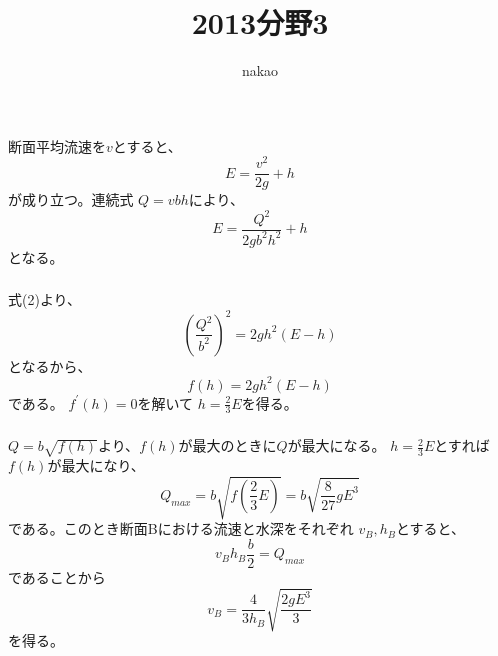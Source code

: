 \documentclass[a4paper]{jsarticle}
\begin{document}
\title{2013分野3}
\author{nakao}
\maketitle

\section{}
\subsection{}
\subsubsection{}
断面平均流速を$v$とすると、
\begin{equation}
  E = \frac{v^2}{2g} + h
\end{equation}
が成り立つ。連続式
$Q = v b h$により、
\begin{equation}
  E = \frac{Q^2}{2 g b^2 h^2} + h
\end{equation}
となる。

\subsubsection{}
式(2)より、
\begin{equation}
  \left(\frac{Q^2}{b^2}\right)^2 = 2 g h^2 (E -h)
\end{equation}
となるから、
\begin{equation}
  f(h) = 2 g h^2 (E - h)
\end{equation}
である。
$f^{\prime}(h) = 0$を解いて
$h = \frac{2}{3} E$を得る。

\subsubsection{}
$Q = b \sqrt{f(h)}$より、$f(h)$が最大のときに$Q$が最大になる。
$h = \frac{2}{3}E$とすれば$f(h)$が最大になり、
\begin{equation}
  Q_{max} = b \sqrt{f \left(\frac{2}{3}E\right)}
  = b \sqrt{\frac{8}{27} g E^3}
\end{equation}
である。このとき断面Bにおける流速と水深をそれぞれ
$v_B, h_B$とすると、
\begin{equation}
  v_B h_B \frac{b}{2} = Q_{max} 
\end{equation}
であることから
\begin{equation}
  v_B = \frac{4}{3 h_B} \sqrt{\frac{2 g E^3}{3}}
\end{equation}
を得る。
\end{document}
